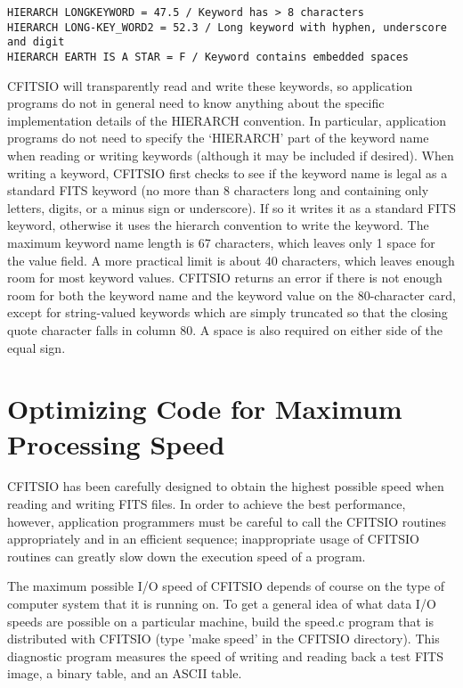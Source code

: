 \documentclass[11pt]{book}
\begin{document}
\begin{verbatim}
HIERARCH LONGKEYWORD = 47.5 / Keyword has > 8 characters
HIERARCH LONG-KEY_WORD2 = 52.3 / Long keyword with hyphen, underscore and digit
HIERARCH EARTH IS A STAR = F / Keyword contains embedded spaces
\end{verbatim}
CFITSIO will transparently read and write these keywords, so application
programs do not in general need to know anything about the specific
implementation details of the HIERARCH convention.  In particular,
application programs do not need to specify the `HIERARCH' part of the
keyword name when reading or writing keywords (although it
may be included if desired).  When writing a keyword, CFITSIO first
checks to see if the keyword name is legal as a standard FITS keyword
(no more than 8 characters long and containing only letters, digits, or
a minus sign or underscore). If so it writes it as a standard FITS
keyword, otherwise it uses the hierarch convention to write the
keyword.   The maximum keyword name length is 67 characters, which
leaves only 1 space for the value field.  A more practical limit is
about 40 characters, which leaves enough room for most keyword values.
CFITSIO returns an error if there is not enough room for both the
keyword name and the keyword value on the 80-character card, except for
string-valued keywords which are simply truncated so that the closing
quote character falls in column 80. A space is also required on either 
side of the equal sign.


\section{Optimizing Code for Maximum Processing Speed}

CFITSIO has been carefully designed to obtain the highest possible
speed when reading and writing FITS files.  In order to achieve the
best performance, however, application programmers must be careful to
call the CFITSIO routines appropriately and in an efficient sequence;
inappropriate usage of CFITSIO routines can greatly slow down the
execution speed of a program.

The maximum possible I/O speed of CFITSIO depends of course on the type
of computer system that it is running on.  To get a general idea of what
data I/O speeds are possible on a particular machine, build the speed.c
program that is distributed with CFITSIO (type 'make speed' in the CFITSIO
directory).  This diagnostic program measures the speed of writing and reading
back a test FITS image, a binary table, and an ASCII table.
\end{document}
